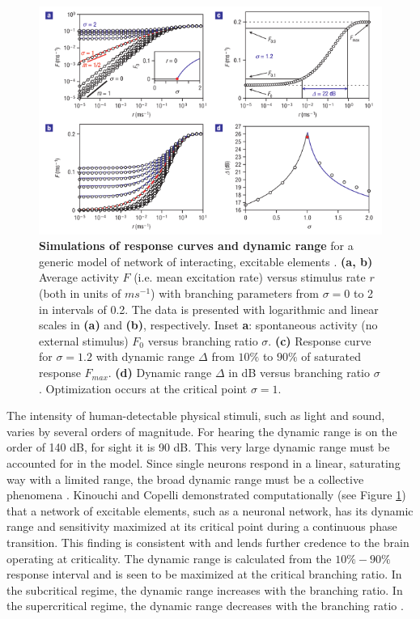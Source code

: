 \documentclass[12pt]{article}
\begin{document}
\begin{figure}      
  \begin{center}    
 \includegraphics[width=1\textwidth]{dynamicrangetheorycopelli}    
    \caption{\textbf{Simulations of response curves and dynamic range} for a generic model of network of interacting, excitable elements \cite{Kinouchi2006b}. \textbf{(a, b)} Average activity $F$ (i.e. mean excitation rate) versus stimulus rate $r$ (both in units of $ms^{-1}$) with branching parameters from $\sigma = 0$ to 2 in intervals of 0.2. The data is presented with logarithmic and linear scales in \textbf{(a)} and \textbf{(b)}, respectively. Inset \textbf{a}: spontaneous activity (no external stimulus) $F_{0}$ versus branching ratio $\sigma$. \textbf{(c)} Response curve for $\sigma = 1.2$ with dynamic range $\Delta$ from $10\%$ to $90\%$ of saturated response $F_{max}$. \textbf{(d)} Dynamic range $\Delta$ in dB versus branching ratio $\sigma$. Optimization occurs at the critical point $\sigma = 1$.}
   \label{Figure::Dynamic Range Theory}   
  \end{center}     
   \end{figure}
   
The intensity of human-detectable physical stimuli, such as light and sound, varies by several orders of magnitude. For hearing the dynamic range is on the order of 140 dB, for sight it is 90 dB. This very large dynamic range must be accounted for in the model. Since single neurons respond in a linear, saturating way with a limited range, the broad dynamic range must be a collective phenomena \cite{Kinouchi2006b}. Kinouchi and Copelli demonstrated computationally (see Figure \ref{Figure::Dynamic Range Theory}) that a network of excitable elements, such as a neuronal network, has its dynamic range and sensitivity maximized at its critical point during a continuous phase transition\cite{Kinouchi2006b}. This finding is consistent with and lends further credence to the brain operating at criticality. The dynamic range is calculated from the $10\%-90\%$ response interval and is seen to be maximized at the critical branching ratio. In the subcritical regime, the dynamic range increases with the branching ratio. In the supercritical regime, the dynamic range decreases with the branching ratio \cite{Larremore2011a, Larremore2012a}.
\end{document}
